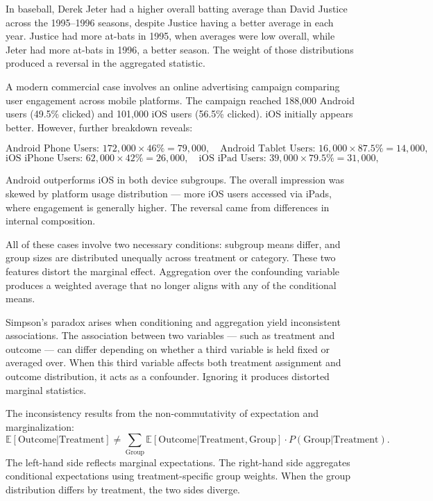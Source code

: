 In baseball, Derek Jeter had a higher overall batting average than David Justice across the 1995–1996 seasons, despite Justice having a better average in each year. Justice had more at-bats in 1995, when averages were low overall, while Jeter had more at-bats in 1996, a better season. The weight of those distributions produced a reversal in the aggregated statistic.

A modern commercial case involves an online advertising campaign comparing user engagement across mobile platforms. The campaign reached 188,000 Android users (49.5\% clicked) and 101,000 iOS users (56.5\% clicked). iOS initially appears better. However, further breakdown reveals:

\[
\text{Android Phone Users: } 172,000 \times 46\% = 79,000, \quad \text{Android Tablet Users: } 16,000 \times 87.5\% = 14,000,
\]
\[
\text{iOS iPhone Users: } 62,000 \times 42\% = 26,000, \quad \text{iOS iPad Users: } 39,000 \times 79.5\% = 31,000,
\]

Android outperforms iOS in both device subgroups. The overall impression was skewed by platform usage distribution — more iOS users accessed via iPads, where engagement is generally higher. The reversal came from differences in internal composition.

All of these cases involve two necessary conditions: subgroup means differ, and group sizes are distributed unequally across treatment or category. These two features distort the marginal effect. Aggregation over the confounding variable produces a weighted average that no longer aligns with any of the conditional means.

Simpson’s paradox arises when conditioning and aggregation yield inconsistent associations. The association between two variables — such as treatment and outcome — can differ depending on whether a third variable is held fixed or averaged over. When this third variable affects both treatment assignment and outcome distribution, it acts as a confounder. Ignoring it produces distorted marginal statistics.

The inconsistency results from the non-commutativity of expectation and marginalization:
\[
\mathbb{E}[\text{Outcome}|\text{Treatment}] \neq \sum_{\text{Group}} \mathbb{E}[\text{Outcome}|\text{Treatment}, \text{Group}] \cdot P(\text{Group}|\text{Treatment}).
\]
The left-hand side reflects marginal expectations. The right-hand side aggregates conditional expectations using treatment-specific group weights. When the group distribution differs by treatment, the two sides diverge.

